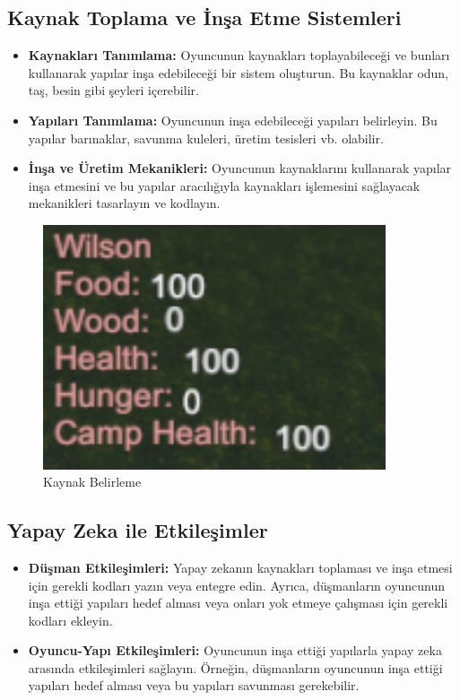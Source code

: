 \documentclass{article}
\begin{document}
\subsection{Kaynak Toplama ve İnşa Etme Sistemleri}

\begin{itemize}
\item \textbf{Kaynakları Tanımlama:} Oyuncunun kaynakları toplayabileceği ve bunları kullanarak yapılar inşa edebileceği bir sistem oluşturun. Bu kaynaklar odun, taş, besin gibi şeyleri içerebilir.
\item \textbf{Yapıları Tanımlama:} Oyuncunun inşa edebileceği yapıları belirleyin. Bu yapılar barınaklar, savunma kuleleri, üretim tesisleri vb. olabilir.
\item \textbf{İnşa ve Üretim Mekanikleri:} Oyuncunun kaynaklarını kullanarak yapılar inşa etmesini ve bu yapılar aracılığıyla kaynakları işlemesini sağlayacak mekanikleri tasarlayın ve kodlayın.
\end{itemize}

\begin{figure}[h]
    \centering
    \includegraphics[width=0.9\textwidth]{kaynaklar.PNG}
    \caption{Kaynak Belirleme}
    \label{fig:resim9}
\end{figure}

\subsection{Yapay Zeka ile Etkileşimler}

\begin{itemize}
\item \textbf{Düşman Etkileşimleri:} Yapay zekanın kaynakları toplaması ve inşa etmesi için gerekli kodları yazın veya entegre edin. Ayrıca, düşmanların oyuncunun inşa ettiği yapıları hedef alması veya onları yok etmeye çalışması için gerekli kodları ekleyin.
\item \textbf{Oyuncu-Yapı Etkileşimleri:} Oyuncunun inşa ettiği yapılarla yapay zeka arasında etkileşimleri sağlayın. Örneğin, düşmanların oyuncunun inşa ettiği yapıları hedef alması veya bu yapıları savunması gerekebilir.
\end{itemize}
\end{document}
